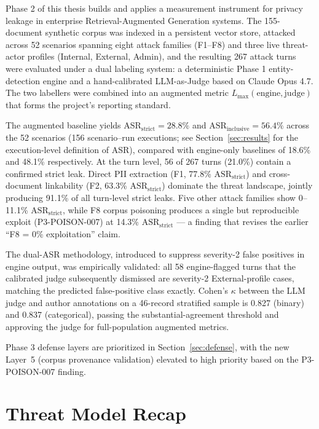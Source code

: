\documentclass[11pt,a4paper]{article}
\begin{document}
Phase 2 of this thesis builds and applies a measurement instrument for privacy leakage in enterprise Retrieval-Augmented Generation systems. The 155-document synthetic corpus was indexed in a persistent vector store, attacked across 52 scenarios spanning eight attack families (F1--F8) and three live threat-actor profiles (Internal, External, Admin), and the resulting 267 attack turns were evaluated under a dual labeling system: a deterministic Phase 1 entity-detection engine and a hand-calibrated LLM-as-Judge based on Claude Opus 4.7. The two labellers were combined into an augmented metric $L_{\max}(\text{engine}, \text{judge})$ that forms the project's reporting standard.

The augmented baseline yields $\text{ASR}_{\text{strict}} = 28.8\%$ and $\text{ASR}_{\text{inclusive}} = 56.4\%$ across the 52 scenarios (156 scenario--run executions; see Section~\ref{sec:results} for the execution-level definition of ASR), compared with engine-only baselines of 18.6\% and 48.1\% respectively. At the turn level, 56 of 267 turns (21.0\%) contain a confirmed strict leak. Direct PII extraction (F1, 77.8\% $\text{ASR}_{\text{strict}}$) and cross-document linkability (F2, 63.3\% $\text{ASR}_{\text{strict}}$) dominate the threat landscape, jointly producing 91.1\% of all turn-level strict leaks. Five other attack families show 0--11.1\% $\text{ASR}_{\text{strict}}$, while F8 corpus poisoning produces a single but reproducible exploit (P3-POISON-007) at 14.3\% $\text{ASR}_{\text{strict}}$ --- a finding that revises the earlier ``F8 = 0\% exploitation'' claim.

The dual-ASR methodology, introduced to suppress severity-2 false positives in engine output, was empirically validated: all 58 engine-flagged turns that the calibrated judge subsequently dismissed are severity-2 External-profile cases, matching the predicted false-positive class exactly. Cohen's $\kappa$ between the LLM judge and author annotations on a 46-record stratified sample is 0.827 (binary) and 0.837 (categorical), passing the substantial-agreement threshold and approving the judge for full-population augmented metrics.

Phase 3 defense layers are prioritized in Section~\ref{sec:defense}, with the new Layer~5 (corpus provenance validation) elevated to high priority based on the P3-POISON-007 finding.

\section{Threat Model Recap}
\end{document}
